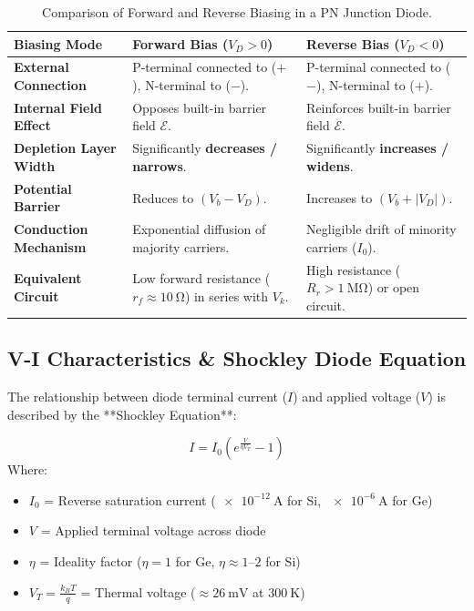 \begin{table}[htbp]
\centering
\small
\begin{tabularx}{\textwidth}{lXX}
\toprule
\textbf{Biasing Mode} & \textbf{Forward Bias ($V_D > 0$)} & \textbf{Reverse Bias ($V_D < 0$)} \\
\midrule
\textbf{External Connection} & P-terminal connected to ($+$), N-terminal to ($-$). & P-terminal connected to ($-$), N-terminal to ($+$). \\
\textbf{Internal Field Effect} & Opposes built-in barrier field $\mathcal{E}$. & Reinforces built-in barrier field $\mathcal{E}$. \\
\textbf{Depletion Layer Width} & Significantly \textbf{decreases / narrows}. & Significantly \textbf{increases / widens}. \\
\textbf{Potential Barrier} & Reduces to $(V_b - V_D)$. & Increases to $(V_b + |V_D|)$. \\
\textbf{Conduction Mechanism} & Exponential diffusion of majority carriers. & Negligible drift of minority carriers ($I_0$). \\
\textbf{Equivalent Circuit} & Low forward resistance ($r_f \approx \SI{10}{\ohm}$) in series with $V_k$. & High resistance ($R_r > \SI{1}{\mega\ohm}$) or open circuit. \\
\bottomrule
\end{tabularx}
\caption{Comparison of Forward and Reverse Biasing in a PN Junction Diode.}
\label{tab:diode-biasing}
\end{table}

\subsection{V-I Characteristics \& Shockley Diode Equation}
The relationship between diode terminal current ($I$) and applied voltage ($V$) is described by the **Shockley Equation**:

\begin{keyequation}
\begin{equation}
    I = I_0 \left( e^{\frac{V}{\eta V_T}} - 1 \right)
\end{equation}
Where:
\begin{itemize}
    \item $I_0$ = Reverse saturation current ($\SI{e-12}{\ampere}$ for Si, $\SI{e-6}{\ampere}$ for Ge)
    \item $V$ = Applied terminal voltage across diode
    \item $\eta$ = Ideality factor ($\eta = 1$ for Ge, $\eta \approx 1\text{--}2$ for Si)
    \item $V_T = \frac{k_B T}{q}$ = Thermal voltage ($\approx \SI{26}{\milli\volt}$ at $\SI{300}{\kelvin}$)
\end{itemize}
\end{keyequation}

